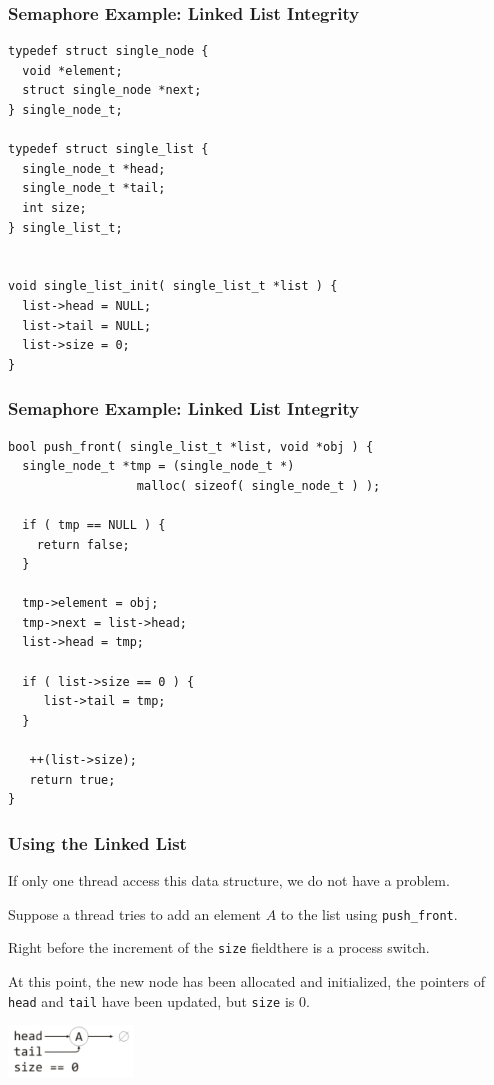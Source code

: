 \begin{frame}[fragile]
\frametitle{Semaphore Example: Linked List Integrity}

\begin{verbatim}
typedef struct single_node {
  void *element;
  struct single_node *next;
} single_node_t;

typedef struct single_list {
  single_node_t *head;
  single_node_t *tail;
  int size;
} single_list_t;


void single_list_init( single_list_t *list ) {
  list->head = NULL;
  list->tail = NULL;
  list->size = 0;
}
\end{verbatim}
\end{frame}

\begin{frame}[fragile]
\frametitle{Semaphore Example: Linked List Integrity}

\begin{verbatim}
bool push_front( single_list_t *list, void *obj ) {
  single_node_t *tmp = (single_node_t *) 
                  malloc( sizeof( single_node_t ) );
  
  if ( tmp == NULL ) {
    return false;
  }
  
  tmp->element = obj;
  tmp->next = list->head;
  list->head = tmp;

  if ( list->size == 0 ) {
     list->tail = tmp;
  }
  
   ++(list->size);
   return true;
}

\end{verbatim}
\end{frame}


\begin{frame}
\frametitle{Using the Linked List}

If only one thread access this data structure, we do not have a problem.

Suppose a thread tries to add an element $A$ to the list using \texttt{push\_front}. 

Right before the increment of the \texttt{size} fieldthere is a process switch. 

At this point, the new node has been allocated and initialized, the pointers of \texttt{head} and \texttt{tail} have been updated, but \texttt{size} is 0. 

\begin{center}
\includegraphics[width=0.25\textwidth]{images/linkedlist1.png}
\end{center}

\end{frame}

